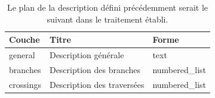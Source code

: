 \begin{table}
    \begin{center}
    \footnotesize
    \begin{tabular}{ | l | l | l | }
        Couche & Titre & Forme\tabularnewline
        \hline
        general & Description générale & text\\
        branches & Description des branches & numbered\_list\\
        crossings & Description des traversées & numbered\_list
    \end{tabular}
    \end{center}
    \caption{Le plan de la description défini précédemment serait le suivant dans le traitement établi.}
    \label{experimentation:table_plan_description}
\end{table}

